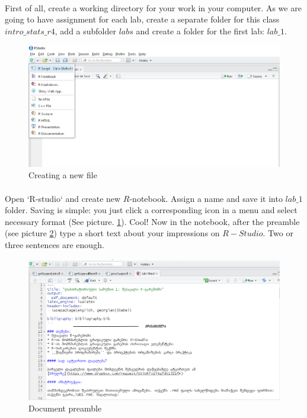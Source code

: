 \documentclass{article}\usepackage[]{graphicx}\usepackage[]{color}
\begin{document}
\paragraph{}
First of all, create a working directory for your work in your computer. As we are going to have assignment for each lab, create a separate folder for this class $intro\_stats\_r4$, add a subfolder $labs$ and create a folder for the first lab: $lab\_1$.
\begin{figure}[h]
\centering
\includegraphics[width=\textwidth]{img/new_menu.PNG}
\caption{Creating a new file}
    \label{create:file}
\end{figure}
\paragraph{}
Open `R-studio` and create new $R$-notebook. Assign a name and save it into $lab\_1$ folder. Saving is simple: you just click a corresponding icon in a menu and select necessary format (See picture. \ref{create:file}).
Cool! Now in the notebook, after the preamble (see picture \ref{preamble}) type a short text about your impressions on $R-Studio$. Two or three sentences are enough.
\begin{figure}[h]
\centering
\includegraphics[width=\textwidth]{img/preamble.PNG}
\caption{Document preamble}
    \label{preamble}
\end{figure}
\end{document}
